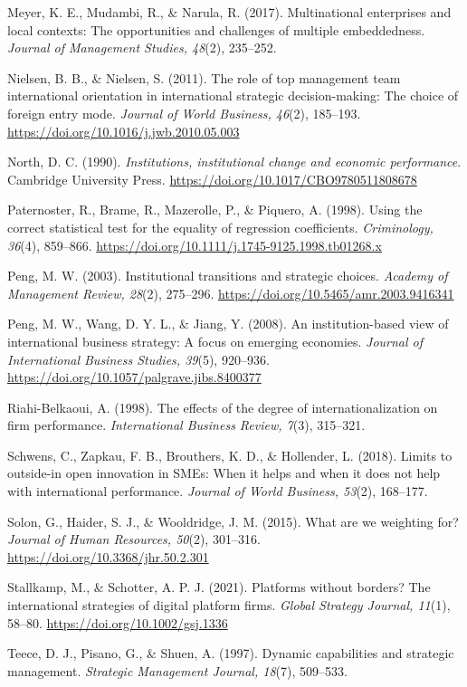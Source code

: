 \documentclass[12pt,a4paper]{article}
\begin{document}
Meyer, K. E., Mudambi, R., \& Narula, R. (2017). Multinational
enterprises and local contexts: The opportunities and challenges of
multiple embeddedness. \emph{Journal of Management Studies, 48}(2),
235--252.

Nielsen, B. B., \& Nielsen, S. (2011). The role of top management team
international orientation in international strategic decision-making:
The choice of foreign entry mode. \emph{Journal of World Business,
46}(2), 185--193. \url{https://doi.org/10.1016/j.jwb.2010.05.003}

North, D. C. (1990). \emph{Institutions, institutional change and
economic performance}. Cambridge University Press.
\url{https://doi.org/10.1017/CBO9780511808678}

Paternoster, R., Brame, R., Mazerolle, P., \& Piquero, A. (1998). Using
the correct statistical test for the equality of regression
coefficients. \emph{Criminology, 36}(4), 859--866.
\url{https://doi.org/10.1111/j.1745-9125.1998.tb01268.x}

Peng, M. W. (2003). Institutional transitions and strategic choices.
\emph{Academy of Management Review, 28}(2), 275--296.
\url{https://doi.org/10.5465/amr.2003.9416341}

Peng, M. W., Wang, D. Y. L., \& Jiang, Y. (2008). An institution-based
view of international business strategy: A focus on emerging economies.
\emph{Journal of International Business Studies, 39}(5), 920--936.
\url{https://doi.org/10.1057/palgrave.jibs.8400377}

Riahi-Belkaoui, A. (1998). The effects of the degree of
internationalization on firm performance. \emph{International Business
Review, 7}(3), 315--321.

Schwens, C., Zapkau, F. B., Brouthers, K. D., \& Hollender, L. (2018).
Limits to outside-in open innovation in SMEs: When it helps and when it
does not help with international performance. \emph{Journal of World
Business, 53}(2), 168--177.

Solon, G., Haider, S. J., \& Wooldridge, J. M. (2015). What are we
weighting for? \emph{Journal of Human Resources, 50}(2), 301--316.
\url{https://doi.org/10.3368/jhr.50.2.301}

Stallkamp, M., \& Schotter, A. P. J. (2021). Platforms without borders?
The international strategies of digital platform firms. \emph{Global
Strategy Journal, 11}(1), 58--80. \url{https://doi.org/10.1002/gsj.1336}

Teece, D. J., Pisano, G., \& Shuen, A. (1997). Dynamic capabilities and
strategic management. \emph{Strategic Management Journal, 18}(7),
509--533.
\end{document}
